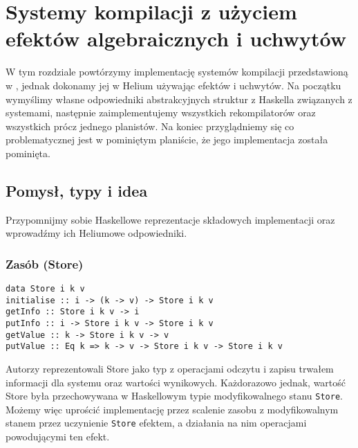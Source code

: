 
\newcommand{\haskinl}[1]{\lstinline[style=haskell-inl]{#1}}
\newcommand{\helinl}[1]{\lstinline[style=Haleff-inl]{#1}}

\chapter{Systemy kompilacji z użyciem efektów algebraicznych i uchwytów}

W tym rozdziale powtórzymy implementację systemów kompilacji przedstawioną w \BSaLC\cite{mokhov2018build}, jednak dokonamy jej w Helium używając efektów i uchwytów. Na początku wymyślimy własne odpowiedniki abstrakcyjnych struktur z Haskella związanych z systemami, następnie zaimplementujemy wszystkich rekompilatorów oraz wszystkich prócz jednego planistów. Na koniec przyglądniemy się co problematycznej jest w pominiętym planiście, że jego implementacja została pominięta.

\section{Pomysł, typy i idea}

Przypomnijmy sobie Haskellowe reprezentacje składowych implementacji oraz wprowadźmy ich Heliumowe odpowiedniki.

\subsection{Zasób (Store)}

\begin{lstlisting}[style=haskell-style]
data Store i k v
initialise :: i -> (k -> v) -> Store i k v
getInfo :: Store i k v -> i
putInfo :: i -> Store i k v -> Store i k v
getValue :: k -> Store i k v -> v
putValue :: Eq k => k -> v -> Store i k v -> Store i k v
\end{lstlisting}

Autorzy \BSaLC\cite{mokhov2018build} reprezentowali Store jako typ z operacjami odczytu i zapisu trwałem informacji dla systemu oraz wartości wynikowych. Każdorazowo jednak, wartość Store była przechowywana w Haskellowym typie modyfikowalnego stanu \haskinl{Store}. Możemy więc uprościć implementację przez scalenie zasobu z modyfikowalnym stanem przez uczynienie \haskinl{Store} efektem, a działania na nim operacjami powodującymi ten efekt.



